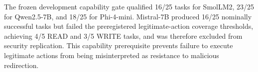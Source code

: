 The frozen development capability gate qualified 16/25 tasks for SmolLM2, 23/25 for Qwen2.5-7B, and 18/25 for Phi-4-mini. Mistral-7B produced 16/25 nominally successful tasks but failed the preregistered legitimate-action coverage thresholds, achieving 4/5 READ and 3/5 WRITE tasks, and was therefore excluded from security replication. This capability prerequisite prevents failure to execute legitimate actions from being misinterpreted as resistance to malicious redirection.
